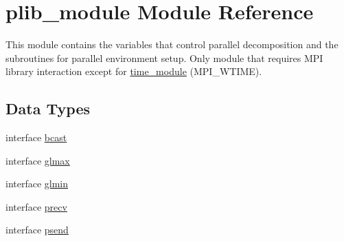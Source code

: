 \hypertarget{classplib__module}{\section{plib\-\_\-module Module Reference}
\label{classplib__module}
}


This module contains the variables that control parallel decomposition and the subroutines for parallel environment setup. Only module that requires M\-P\-I library interaction except for \hyperlink{classtime__module}{time\-\_\-module} (M\-P\-I\-\_\-\-W\-T\-I\-M\-E).  


\subsection*{Data Types}
\begin{DoxyCompactItemize}
\item 
interface \hyperlink{interfaceplib__module_1_1bcast}{bcast}
\item 
interface \hyperlink{interfaceplib__module_1_1glmax}{glmax}
\item 
interface \hyperlink{interfaceplib__module_1_1glmin}{glmin}
\item 
interface \hyperlink{interfaceplib__module_1_1precv}{precv}
\item 
interface \hyperlink{interfaceplib__module_1_1psend}{psend}
\end{DoxyCompactItemize}
